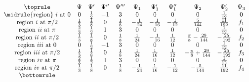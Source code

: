 \documentclass{article}
\def \Rone{\uppercase\expandafter{\romannumeral1}}
\def \Rtwo{\uppercase\expandafter{\romannumeral2}}
\def \Rthree{\uppercase\expandafter{\romannumeral3}}
\def \Rfour{\uppercase\expandafter{\romannumeral4}}
\numberwithin{figure}{section}
\numberwithin{equation}{section}
\theoremstyle{remark}
\theoremstyle{definition}
\begin{document}
\begin{table}[H]
\setlength{\arraycolsep}{4pt}
    \[\begin{array}{ccccccccccc}\toprule
	&	\Psi & \Psi' &\Psi'' &\Psi''' &\Psi_1&\Psi_1'&\Psi_1''&\Psi_2&\Psi_2'&\Psi_3\\ \midrule
	{\rm region}\ \Rone\ {\rm at}\ 0&0 & \frac{1}{2} & -1 & 3 & 0&0&0&0&\frac{1}{12}&0\\ 
	{\rm region}\ \Rone\ {\rm at}\ \pi/2&\frac{1}{3} & \frac{1}{8}& 0 & \frac{1}{8} & -\frac{1}{24}&-\frac{1}{16}&-\frac{1}{12}&\frac{5}{144}&\frac{11}{192}&f_1\\
	{\rm region}\ \Rtwo\ {\rm at}\ \pi&\frac{2}{3} & \frac{1}{2} & 1 & 3 & 0&0&0&0&\frac{1}{12}&0\\
	{\rm region}\ \Rtwo\ {\rm at}\ \pi/2&\frac{1}{3} & \frac{1}{8} & 0 & \frac{1}{8}& \frac{1}{24}&-\frac{1}{16}&\frac{1}{12}&\frac{\pi }{8}-\frac{29}{144}&-\frac{25}{192}&f_2\\
	{\rm region}\ \Rthree\ {\rm at}\ 0&0 & \frac{1}{2} & -1 & 3 & 0&0&0&0&\frac{1}{12}&0\\ 
	{\rm region}\ \Rthree\ {\rm at}\ \pi/2&\frac{1}{3} & \frac{1}{8} & 0 & \frac{1}{8} & \frac{1}{24}&\frac{1}{16}&\frac{1}{12}&-\frac{\pi }{8}+\frac{29}{144}&-\frac{25}{192}&f_3\\ 
	{\rm region}\ \Rfour\ {\rm at}\ \pi& \frac{2}{3} & \frac{1}{2} & 1 & 3 & 0&0&0&0&\frac{1}{12}&0\\ 
	{\rm region}\ \Rfour\ {\rm at}\ \pi/2& \frac{1}{3} & \frac{1}{8} & 0 & \frac{1}{8} & -\frac{1}{24} &\frac{1}{16}&-\frac{1}{12}&-\frac{5}{144}&\frac{11}{192}&f_4\\ \bottomrule
\end{array}\]
\caption{values of $\Psi_i$ and their derivatives near discontinuity lines}
\label{values of Psi}
\end{table}





\end{document}
